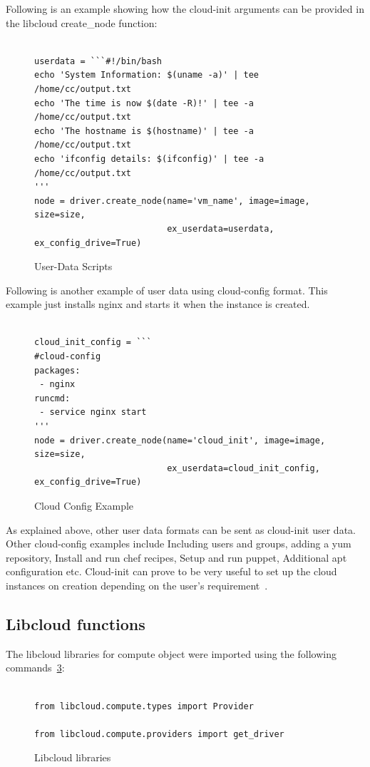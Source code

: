 Following is an example showing how the cloud-init arguments can be provided 
in the libcloud create\_node function:

\begin{figure}[htb]
\begin{verbatim}

userdata = ```#!/bin/bash
echo 'System Information: $(uname -a)' | tee /home/cc/output.txt
echo 'The time is now $(date -R)!' | tee -a /home/cc/output.txt
echo 'The hostname is $(hostname)' | tee -a /home/cc/output.txt
echo 'ifconfig details: $(ifconfig)' | tee -a /home/cc/output.txt
'''
node = driver.create_node(name='vm_name', image=image, size=size,
                          ex_userdata=userdata, ex_config_drive=True)
\end{verbatim}
\caption{User-Data Scripts
~\cite{hid-sp18-516-www-cloud-init}}\label{c:cloud-init-example1}
\end{figure}

Following is another example of user data using cloud-config format. This
example just installs nginx and starts it when the instance is created.

\begin{figure}[htb]
\begin{verbatim}

cloud_init_config = ```
#cloud-config
packages:
 - nginx
runcmd:
 - service nginx start
'''
node = driver.create_node(name='cloud_init', image=image, size=size,
                          ex_userdata=cloud_init_config, ex_config_drive=True)
\end{verbatim}
\caption{Cloud Config Example
~\cite{hid-sp18-516-www-libcloud-functions}}\label{c:cloud-init-example2}
\end{figure}

As explained above, other user data formats can be sent as cloud-init user 
data. Other cloud-config examples include Including users and groups, adding 
a yum repository, Install and run chef recipes, Setup and run puppet, 
Additional apt configuration etc. Cloud-init can prove to be very useful to 
set up the cloud instances on creation depending on the user's
requirement~\cite{hid-sp18-516-www-cloud-init}.

\subsection{Libcloud functions}
The libcloud libraries for compute object were imported using the following
commands~\ref{c:libcloud-libraries}:
\begin{figure}[htb]

\begin{verbatim}

from libcloud.compute.types import Provider

from libcloud.compute.providers import get_driver

\end{verbatim}

\caption{Libcloud libraries
~\cite{hid-sp18-516-www-libcloud-functions}}\label{c:libcloud-libraries}

\end{figure}

